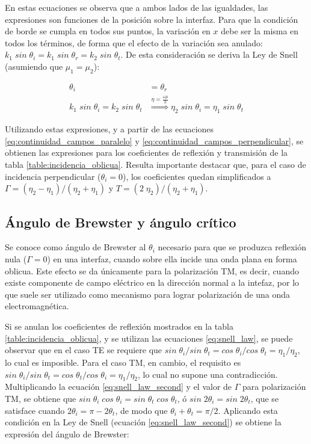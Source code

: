 En estas ecuaciones se observa que a ambos lados de las igualdades, las expresiones son funciones de la posición sobre la interfaz. Para que la condición de borde se cumpla en todos sus puntos, la variación en $x$ debe ser la misma en todos los términos, de forma que el efecto de la variación sea anulado: $k_1 \; sin\; \theta_i = k_1 \; sin \; \theta_r = k_2 \; sin\; \theta_t$.  De esta consideración se deriva la Ley de Snell (asumiendo que $\mu_1 = \mu_2$):

\begin{subequations}
	\label{eq:snell_law}
	\begin{align}
	\theta_i &= \theta_r \\
	k_1 \; sin\; \theta_i = k_2 \; sin\; \theta_t & \overset{\eta=\frac{\omega\mu}{k}}{\Longrightarrow} \eta_2 \; sin\; \theta_i = \eta_1 \; sin\; \theta_t \label{eq:snell_law_second}
	\end{align}
\end{subequations}

Utilizando estas expresiones, y a partir de las ecuaciones \ref{eq:continuidad_campos_paralelo} y \ref{eq:continuidad_campos_perpendicular}, se obtienen las expresiones para los coeficientes de reflexión y transmisión de la tabla \ref{table:incidencia_oblicua}. Resulta importante destacar que, para el caso de incidencia perpendicular ($\theta_i = 0$), los coeficientes quedan simplificados a $\Gamma = (\eta_2 - \eta_1)/(\eta_2 + \eta_1)$ y $T = (2 \; \eta_2)/(\eta_2 + \eta_1)$.

\subsection{Ángulo de Brewster y ángulo crítico}

Se conoce como ángulo de Brewster al $\theta_i$ necesario para que se produzca reflexión nula ($\Gamma = 0$) en una interfaz, cuando sobre ella incide una onda plana en forma oblicua. Este efecto se da únicamente para la polarización TM, es decir, cuando existe componente de campo eléctrico en la dirección normal a la intefaz, por lo que suele ser utilizado como mecanismo para lograr polarización de una onda electromagnética.

Si se anulan los coeficientes de reflexión mostrados en la tabla \ref{table:incidencia_oblicua}, y se utilizan las ecuaciones \ref{eq:snell_law}, se puede observar que en el caso TE se requiere que $sin \; \theta_i / sin \; \theta_t = cos \; \theta_i / cos \; \theta_t = \eta_1 / \eta_2$, lo cual es imposible. Para el caso TM, en cambio, el requisito es $sin \; \theta_i / sin \; \theta_t = cos \; \theta_t / cos \; \theta_i = \eta_1 / \eta_2$, lo cual no supone una contradicción. Multiplicando la ecuación \ref{eq:snell_law_second} y el valor de $\Gamma$ para polarización TM, se obtiene que $sin\;\theta_i \; cos \; \theta_i = sin \; \theta_t \; cos \; \theta_t$, ó $sin \; 2\theta_i = sin \; 2\theta_t$, que se satisface cuando $2\theta_i = \pi - 2\theta_t$, de modo que $\theta_i + \theta_t = \pi/2$. Aplicando esta condición en la Ley de Snell (ecuación \ref{eq:snell_law_second}) se obtiene la expresión del ángulo de Brewster:

